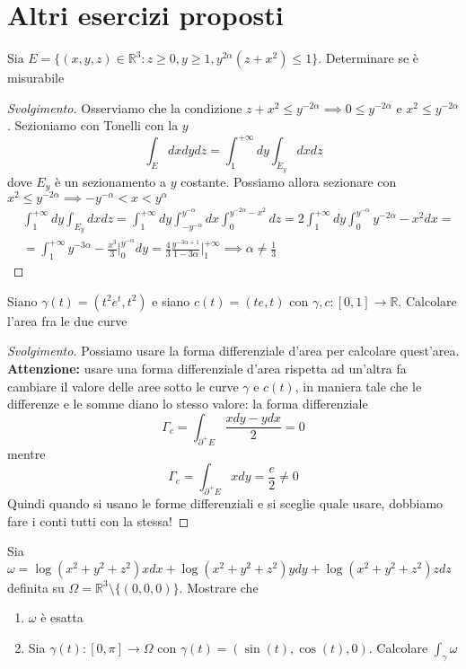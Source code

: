 \chapter{Altri esercizi proposti}
\begin{exercise}
	Sia $E=\{(x, y, z) \in \mathbb{R}^3 : z \geq 0, y \geq 1, y^{2 \alpha}(z + x^2) \leq 1 \}$. Determinare se è misurabile
\end{exercise}
\begin{proof}[Svolgimento]
	Osserviamo che la condizione $z + x^2 \leq y^{-2 \alpha} \implies 0 \leq y^{-2\alpha}$ e $x^2 \leq y^{-2 \alpha}$. Sezioniamo con Tonelli con la $y$
	$$
	\int_E dxdydz = \int_1^{+\infty} dy \int_{E_y} dxdz
	$$
	dove $E_y$ è un sezionamento a $y$ costante. Possiamo allora sezionare con $x^2 \leq y^{-2\alpha} \implies -y^{-\alpha} < x < y^{\alpha}$
	\begin{align*}
	&\int_1^{+\infty} dy \int_{E_y} dxdz = \int_1^{+\infty} dy \int_{-y^{-\alpha}}^{y^{-\alpha}} dx \int_0^{y^{-2 \alpha} - x^2} dz = 2 \int_1^{+\infty} dy \int_0^{y^{-\alpha}} y^{-2 \alpha} - x^2 dx = \\
	&=\int_1^{+\infty} y^{-3 \alpha} - \frac{x^3}{3}\Bigg|_0^{y^{-\alpha}} dy = \frac{4}{3} \frac{y^{-3\alpha + 1}}{1 - 3 \alpha}\Bigg|_1^{+\infty} \implies \alpha \neq \frac{1}{3}
	\end{align*}
\end{proof}
\begin{exercise}
Siano $\gamma(t)=(t^2 e^t, t^2)$ e siano $c(t)=(te, t)$ con $\gamma, c:[0,1] \to \mathbb{R}$. Calcolare l'area fra le due curve
\end{exercise}
\begin{proof}[Svolgimento]
	Possiamo usare la forma differenziale d'area per calcolare quest'area. \textbf{Attenzione:} usare una forma differenziale d'area rispetta ad un'altra fa cambiare il valore delle aree sotto le curve $\gamma$ e $c(t)$, in maniera tale che le differenze e le somme diano lo stesso valore: la forma differenziale
	$$
	\Gamma_c = \int_{\partial^{+} E} \frac{xdy - ydx}{2} = 0
	$$
	mentre
	$$
	\Gamma_c = \int_{\partial^{+} E} xdy = \frac{e}{2} \neq 0
	$$
	Quindi quando si usano le forme differenziali e si sceglie quale usare, dobbiamo fare i conti tutti con la stessa!
\end{proof}
\begin{exercise}
	Sia $\omega = \log(x^2 + y^2 + z^2)xdx + \log(x^2+y^2+z^2)ydy + \log(x^2+y^2+z^2)zdz$ definita su $\Omega = \mathbb{R}^3 \setminus \{(0, 0, 0)\}$. Mostrare che 
	\begin{enumerate}
		\item $\omega$ è esatta
		\item Sia $\gamma(t) : [0, \pi] \to \Omega$ con $\gamma(t) = (\sin(t), \cos(t), 0)$. Calcolare $\int_{\gamma} \omega$
	\end{enumerate}
\end{exercise}